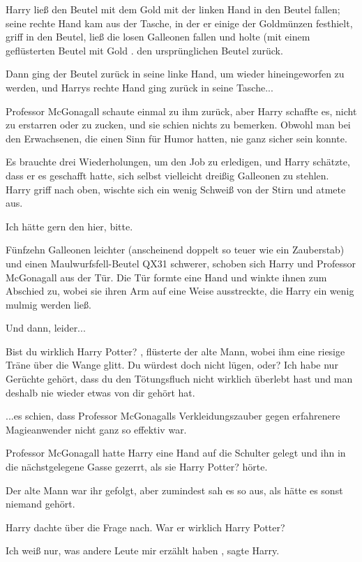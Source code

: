 Harry ließ den Beutel mit dem Gold mit der linken Hand in
den Beutel fallen; seine rechte Hand kam aus der Tasche, in der er einige der Goldmünzen festhielt, griff in den Beutel,
ließ die losen Galleonen fallen und holte (mit einem geflüsterten \glqq Beutel mit Gold\grqq{} . den ursprünglichen Beutel
zurück.

Dann ging der Beutel zurück in seine linke Hand, um wieder hineingeworfen zu werden, und Harrys
rechte Hand ging zurück in seine Tasche...

Professor McGonagall schaute einmal zu ihm zurück, aber Harry
schaffte es, nicht zu erstarren oder zu zucken, und sie schien nichts zu bemerken. Obwohl man bei den Erwachsenen, die
einen Sinn für Humor hatten, nie ganz sicher sein konnte.

Es brauchte drei Wiederholungen, um den Job zu
erledigen, und Harry schätzte, dass er es geschafft hatte, sich selbst vielleicht dreißig Galleonen zu stehlen. Harry
griff nach oben, wischte sich ein wenig Schweiß von der Stirn und atmete aus.

\glqq Ich hätte gern den hier,
bitte.\grqq{}

Fünfzehn Galleonen leichter (anscheinend doppelt so teuer wie ein Zauberstab) und einen
Maulwurfsfell-Beutel QX31 schwerer, schoben sich Harry und Professor McGonagall aus der Tür. Die Tür formte eine Hand
und winkte ihnen zum Abschied zu, wobei sie ihren Arm auf eine Weise ausstreckte, die Harry ein wenig mulmig werden
ließ.

Und dann, leider...

\glqq Bist du wirklich Harry Potter?\grqq{} , flüsterte der alte Mann,
wobei ihm eine riesige Träne über die Wange glitt.
\glqq Du würdest doch nicht lügen, oder? Ich habe nur Gerüchte
gehört, dass du den Tötungsfluch nicht wirklich überlebt hast und man deshalb nie wieder etwas von dir gehört hat.\grqq{}

...es schien, dass Professor McGonagalls Verkleidungszauber gegen erfahrenere Magieanwender nicht ganz so
effektiv war.

Professor McGonagall hatte Harry eine Hand auf die Schulter gelegt und ihn in die
nächstgelegene Gasse gezerrt, als sie \glqq Harry Potter?\grqq{} hörte.

Der alte Mann war ihr gefolgt, aber
zumindest sah es so aus, als hätte es sonst niemand gehört.

Harry dachte über die Frage nach. War er
wirklich Harry Potter?

\glqq Ich weiß nur, was andere Leute mir erzählt haben\grqq{} , sagte Harry.

